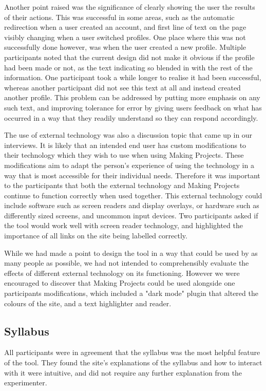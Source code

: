 \documentclass{l4proj}
\begin{document}
Another point raised was the significance of clearly showing the user the results of their actions. This was successful in some areas, such as the automatic redirection when a user created an account, and first line of text on the page visibly changing when a user switched profiles. One place where this was not successfully done however, was when the user created a new profile. Multiple participants noted that the current design did not make it obvious if the profile had been made or not, as the text indicating so blended in with the rest of the information. One participant took a while longer to realise it had been successful, whereas another participant did not see this text at all and instead created another profile. This problem can be addressed by putting more emphasis on any such text, and improving tolerance for error by giving users feedback on what has occurred in a way that they readily understand so they can respond accordingly. 

The use of external technology was also a discussion topic that came up in our interviews. It is likely that an intended end user has custom modifications to their technology which they wish to use when using Making Projects. These modifications aim to adapt the person's experience of using the technology in a way that is most accessible for their individual needs. Therefore it was important to the participants that both the external technology and Making Projects continue to function correctly when used together. This external technology could include software such as screen readers and display overlays, or hardware such as differently sized screens, and uncommon input devices. Two participants asked if the tool would work well with screen reader technology, and highlighted the importance of all links on the site being labelled correctly. 

While we had made a point to design the tool in a way that could be used by as many people as possible, we had not intended to comprehensibly evaluate the effects of different external technology on its functioning. However we were encouraged to discover that Making Projects could be used alongside one participants modifications, which included a "dark mode" plugin that altered the colours of the site, and a text highlighter and reader.  

\subsection{Syllabus} 
All participants were in agreement that the syllabus was the most helpful feature of the tool. They found the site's explanations of the syllabus and how to interact with it were intuitive, and did not require any further explanation from the experimenter. 
\end{document}
